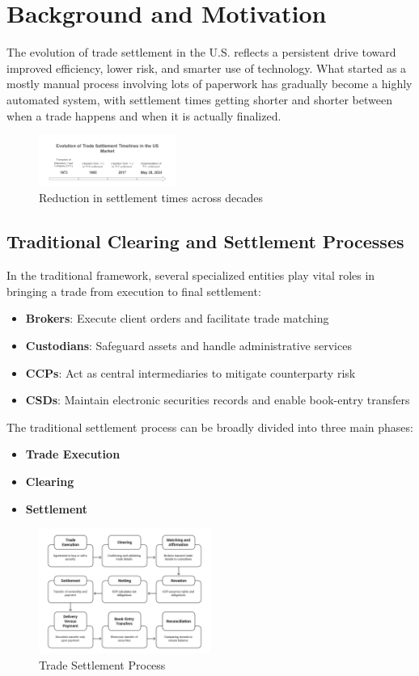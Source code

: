 \documentclass[conference]{IEEEtran}
\begin{document}
\section{Background and Motivation}
The evolution of trade settlement in the U.S. reflects a persistent drive toward improved efficiency, lower risk, and smarter use of technology. What started as a mostly manual process involving lots of paperwork has gradually become a highly automated system, with settlement times getting shorter and shorter between when a trade happens and when it is actually finalized.
\begin{figure}[htbp]
    \centering
    \includegraphics[width=0.4\textwidth]{1.png}
    \caption{Reduction in settlement times across decades}
    \label{fig:settlement_timeline}
\end{figure}
\subsection{Traditional Clearing and Settlement Processes}
In the traditional framework, several specialized entities play vital roles in bringing a trade from execution to final settlement:

\begin{itemize}
    \item \textbf{Brokers}: Execute client orders and facilitate trade matching
    \item \textbf{Custodians}: Safeguard assets and handle administrative services
    \item \textbf{CCPs}: Act as central intermediaries to mitigate counterparty risk
    \item \textbf{CSDs}: Maintain electronic securities records and enable book-entry transfers
\end{itemize}
The traditional settlement process can be broadly divided into three main phases:
\begin{itemize}
    \item \textbf{Trade Execution}
     \item \textbf{Clearing}
      \item \textbf{Settlement}
\end{itemize}
\begin{figure}[H]
    \centering
    \includegraphics[width=0.5\textwidth]{2.png}
    \caption{Trade Settlement Process}
    \label{fig:settlement_timeline}
\end{figure}
\end{document}
